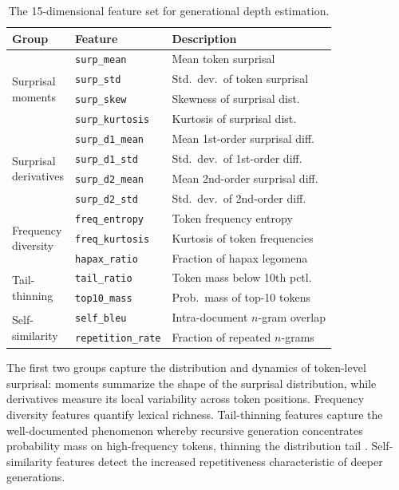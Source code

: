 \begin{table}[t]
\centering
\small
\caption{The 15-dimensional feature set for generational depth estimation.}
\label{tab:features}
\begin{tabular}{lll}
\toprule
\textbf{Group} & \textbf{Feature} & \textbf{Description} \\
\midrule
\multirow{4}{*}{\parbox{2.2cm}{Surprisal\\moments}}
  & \texttt{surp\_mean}      & Mean token surprisal \\
  & \texttt{surp\_std}       & Std.\ dev.\ of token surprisal \\
  & \texttt{surp\_skew}      & Skewness of surprisal dist. \\
  & \texttt{surp\_kurtosis}  & Kurtosis of surprisal dist. \\
\midrule
\multirow{4}{*}{\parbox{2.2cm}{Surprisal\\derivatives}}
  & \texttt{surp\_d1\_mean}  & Mean 1st-order surprisal diff. \\
  & \texttt{surp\_d1\_std}   & Std.\ dev.\ of 1st-order diff. \\
  & \texttt{surp\_d2\_mean}  & Mean 2nd-order surprisal diff. \\
  & \texttt{surp\_d2\_std}   & Std.\ dev.\ of 2nd-order diff. \\
\midrule
\multirow{3}{*}{\parbox{2.2cm}{Frequency\\diversity}}
  & \texttt{freq\_entropy}   & Token frequency entropy \\
  & \texttt{freq\_kurtosis}  & Kurtosis of token frequencies \\
  & \texttt{hapax\_ratio}    & Fraction of hapax legomena \\
\midrule
\multirow{2}{*}{\parbox{2.2cm}{Tail-\\thinning}}
  & \texttt{tail\_ratio}     & Token mass below 10th pctl. \\
  & \texttt{top10\_mass}     & Prob.\ mass of top-10 tokens \\
\midrule
\multirow{2}{*}{\parbox{2.2cm}{Self-\\similarity}}
  & \texttt{self\_bleu}       & Intra-document $n$-gram overlap \\
  & \texttt{repetition\_rate} & Fraction of repeated $n$-grams \\
\bottomrule
\end{tabular}
\end{table}

The first two groups capture the distribution and dynamics of token-level surprisal: moments summarize the shape of the surprisal distribution, while derivatives measure its local variability across token positions.
Frequency diversity features quantify lexical richness.
Tail-thinning features capture the well-documented phenomenon whereby recursive generation concentrates probability mass on high-frequency tokens, thinning the distribution tail \cite{shumailov2024collapse, dohmatob2024model}.
Self-similarity features detect the increased repetitiveness characteristic of deeper generations.


